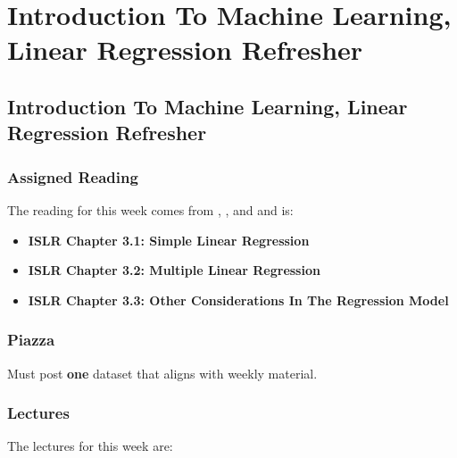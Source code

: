 \clearpage

\newcommand{\ChapTitle}{Introduction To Machine Learning, Linear Regression Refresher}
\newcommand{\SectionTitle}{Introduction To Machine Learning, Linear Regression Refresher}

\chapter{\ChapTitle}
\section{\SectionTitle}

\subsection{Assigned Reading}

The reading for this week comes from \ISLRPython, \ISLRR, and \ESLII \hspace*{1pt} and is:

\begin{itemize}
    \item \textbf{ISLR Chapter 3.1: Simple Linear Regression}
    \item \textbf{ISLR Chapter 3.2: Multiple Linear Regression}
    \item \textbf{ISLR Chapter 3.3: Other Considerations In The Regression Model}
\end{itemize}

\subsection{Piazza}

Must post \textbf{one} dataset that aligns with weekly material.

\subsection{Lectures}

The lectures for this week are:

